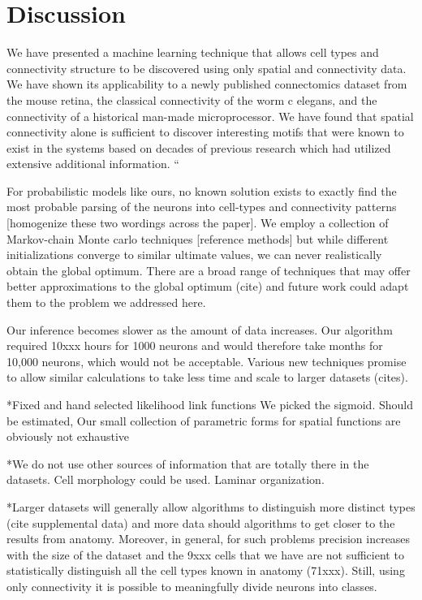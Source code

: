 \documentclass{nature}
\begin{document}
\section{Discussion}
We have presented a machine learning technique that allows cell types and connectivity structure to be discovered using only spatial and connectivity data. We have shown its applicability to a newly published connectomics dataset from the mouse retina, the classical connectivity of the worm c elegans, and the connectivity of a historical man-made microprocessor. We have found that spatial connectivity alone is sufficient to discover interesting motifs that were known to exist in the systems based on decades of previous research which had utilized extensive additional information. “

For probabilistic models like ours, no known solution exists to exactly find the most probable parsing of the neurons into cell-types and connectivity patterns [homogenize these two wordings across the paper]. We employ a collection of Markov-chain Monte carlo techniques [reference methods] but while different initializations converge to similar ultimate values, we can never realistically obtain the global optimum. There are a broad range of techniques that may offer better approximations to the global optimum (cite) and future work could adapt them to the problem we addressed here. 

Our inference becomes slower as the amount of data increases. Our algorithm required 10xxx hours for 1000 neurons and would therefore take months for 10,000 neurons, which would not be acceptable. Various new techniques promise to allow similar calculations to take less time and scale to larger datasets (cites). 


*Fixed and hand selected likelihood link functions We picked the sigmoid. Should be estimated, Our small collection of parametric forms for spatial functions are obviously not exhaustive

*We do not use other sources of information that are totally there in the datasets. Cell morphology could be used. Laminar organization.

*Larger datasets will generally allow algorithms to distinguish more distinct types (cite supplemental data) and more data should algorithms to get closer to the results from anatomy. Moreover, in general, for such problems precision increases with the size of the dataset and the 9xxx cells that we have are not sufficient to statistically distinguish all the cell types known in anatomy (71xxx). Still, using only connectivity it is possible to meaningfully divide neurons into classes. 
\end{document}
